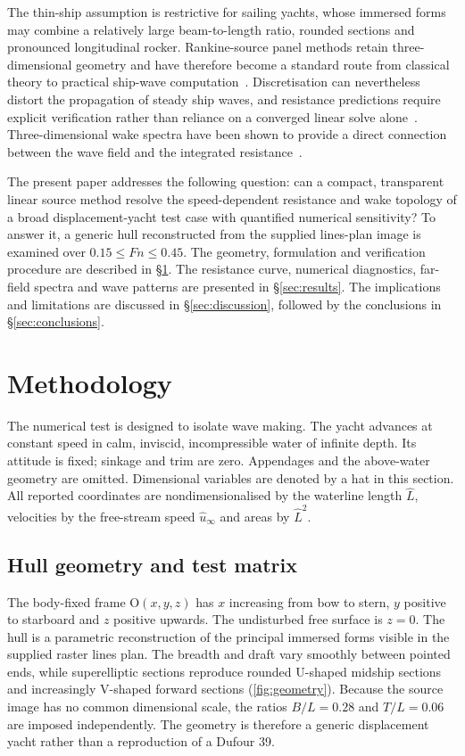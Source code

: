 \documentclass{jfm}
\begin{document}
The thin-ship assumption is restrictive for sailing yachts, whose immersed
forms may combine a relatively large beam-to-length ratio, rounded sections and
pronounced longitudinal rocker. Rankine-source panel methods retain
three-dimensional geometry and have therefore become a standard route from
classical theory to practical ship-wave computation~\citep{Dawson1977}.
Discretisation can nevertheless distort the propagation of steady ship waves,
and resistance predictions require explicit verification rather than reliance
on a converged linear solve alone~\citep{NakosSclavounos1990}. Three-dimensional
wake spectra have been shown to provide a direct connection between the wave
field and the integrated resistance~\citep{NakosSclavounos1994}.

The present paper addresses the following question: can a compact, transparent
linear source method resolve the speed-dependent resistance and wake topology
of a broad displacement-yacht test case with quantified numerical
sensitivity? To answer it, a generic hull reconstructed from the supplied
lines-plan image is examined over $0.15\leq Fn\leq0.45$. The geometry,
formulation and verification procedure are described in \S\ref{sec:method}.
The resistance curve, numerical diagnostics, far-field spectra and wave
patterns are presented in \S\ref{sec:results}. The implications and limitations
are discussed in \S\ref{sec:discussion}, followed by the conclusions in
\S\ref{sec:conclusions}.

\section{Methodology}\label{sec:method}

The numerical test is designed to isolate wave making. The yacht advances at
constant speed in calm, inviscid, incompressible water of infinite depth. Its
attitude is fixed; sinkage and trim are zero. Appendages and the above-water
geometry are omitted. Dimensional variables are denoted by a hat in this
section. All reported coordinates are nondimensionalised by the waterline
length $\hat L$, velocities by the free-stream speed $\hat u_\infty$ and areas
by $\hat L^2$.

\subsection{Hull geometry and test matrix}\label{subsec:geometry}

The body-fixed frame O$(x,y,z)$ has $x$ increasing from bow to stern, $y$
positive to starboard and $z$ positive upwards. The undisturbed free surface is
$z=0$. The hull is a parametric reconstruction of the principal immersed forms
visible in the supplied raster lines plan. The breadth and draft vary smoothly
between pointed ends, while superelliptic sections reproduce rounded U-shaped
midship sections and increasingly V-shaped forward sections
(\cref{fig:geometry}). Because the source image has no common dimensional
scale, the ratios $B/L=0.28$ and $T/L=0.06$ are imposed independently. The
geometry is therefore a generic displacement yacht rather than a reproduction
of a Dufour 39.
\end{document}
